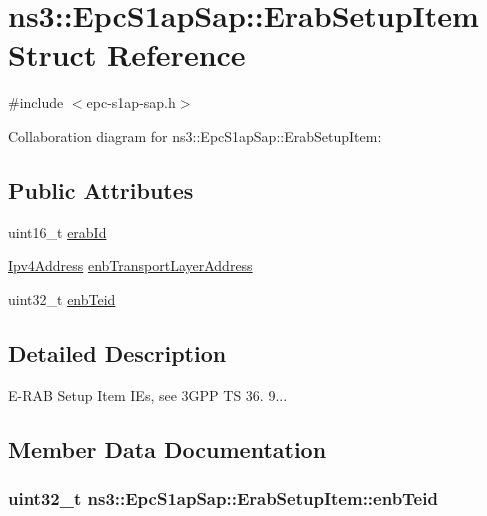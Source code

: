 \hypertarget{structns3_1_1EpcS1apSap_1_1ErabSetupItem}{}\section{ns3\+:\+:Epc\+S1ap\+Sap\+:\+:Erab\+Setup\+Item Struct Reference}
\label{structns3_1_1EpcS1apSap_1_1ErabSetupItem}


{\ttfamily \#include $<$epc-\/s1ap-\/sap.\+h$>$}



Collaboration diagram for ns3\+:\+:Epc\+S1ap\+Sap\+:\+:Erab\+Setup\+Item\+:
\subsection*{Public Attributes}
\begin{DoxyCompactItemize}
\item 
uint16\+\_\+t \hyperlink{structns3_1_1EpcS1apSap_1_1ErabSetupItem_a138f70c0f326bfb3a319d8486aaad070}{erab\+Id}
\item 
\hyperlink{classns3_1_1Ipv4Address}{Ipv4\+Address} \hyperlink{structns3_1_1EpcS1apSap_1_1ErabSetupItem_a6509d14b5dcb8a8dc70386b90efbaeaa}{enb\+Transport\+Layer\+Address}
\item 
uint32\+\_\+t \hyperlink{structns3_1_1EpcS1apSap_1_1ErabSetupItem_a57f21f6296b1cc6cf4028246bcb04de5}{enb\+Teid}
\end{DoxyCompactItemize}


\subsection{Detailed Description}
E-\/\+R\+AB Setup Item I\+Es, see 3\+G\+PP TS 36. 9... 

\subsection{Member Data Documentation}
\subsubsection[{\texorpdfstring{enb\+Teid}{enbTeid}}]{\setlength{\rightskip}{0pt plus 5cm}uint32\+\_\+t ns3\+::\+Epc\+S1ap\+Sap\+::\+Erab\+Setup\+Item\+::enb\+Teid}\hypertarget{structns3_1_1EpcS1apSap_1_1ErabSetupItem_a57f21f6296b1cc6cf4028246bcb04de5}{}\label{structns3_1_1EpcS1apSap_1_1ErabSetupItem_a57f21f6296b1cc6cf4028246bcb04de5}
